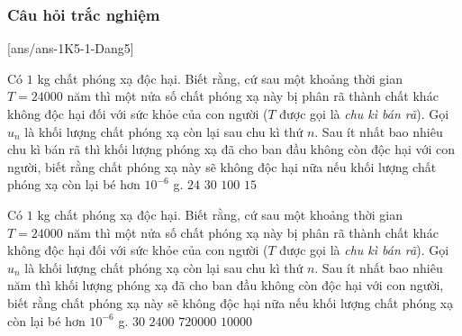 \subsubsection{Câu hỏi trắc nghiệm}
[ans/ans-1K5-1-Dang5]
\begin{ex}%
	Có $1$ kg chất phóng xạ độc hại. Biết rằng, cứ sau một khoảng thời gian $T=24000$ năm thì một nửa số chất phóng xạ này bị phân rã thành chất khác không độc hại đối với sức khỏe của con người ($T$ được gọi là \textit{chu kì bán rã}). Gọi $u_n$ là khối lượng chất phóng xạ còn lại sau chu kì thứ $n$.
	Sau ít nhất bao nhiêu chu kì bán rã thì khối lượng phóng xạ đã cho ban đầu không còn độc hại với con người, biết rằng chất phóng xạ này sẽ không độc hại nữa nếu khối lượng chất phóng xạ còn lại bé hơn $10^{-6}$ g.
	\choice
	{$24$}
	{\True $30$}
	{$100$}
	{$15$}
\end{ex}
\begin{ex}%
	Có $1$ kg chất phóng xạ độc hại. Biết rằng, cứ sau một khoảng thời gian $T=24000$ năm thì một nửa số chất phóng xạ này bị phân rã thành chất khác không độc hại đối với sức khỏe của con người ($T$ được gọi là \textit{chu kì bán rã}). Gọi $u_n$ là khối lượng chất phóng xạ còn lại sau chu kì thứ $n$.
	Sau ít nhất bao nhiêu năm thì khối lượng phóng xạ đã cho ban đầu không còn độc hại với con người, biết rằng chất phóng xạ này sẽ không độc hại nữa nếu khối lượng chất phóng xạ còn lại bé hơn $10^{-6}$ g.
	\choice
	{$30$}
	{$2400$}
	{\True $720000$}
	{$10000$}
\end{ex}
